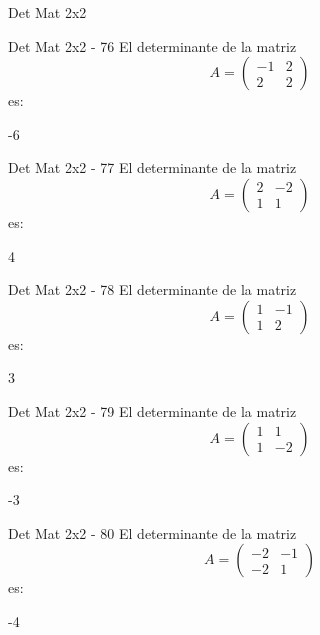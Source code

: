 \documentclass[a4,11pt]{aleph-notas}
\begin{document}
\begin{quiz}{Det Mat 2x2}
\begin{numerical}[tolerance=0]%
    {Det Mat 2x2 - 76}
    El determinante de la matriz
    \[
        A = \begin{pmatrix} -1 & 2 \\ 2 & 2 \end{pmatrix}
    \]
    es:
    \item[] -6
\end{numerical}

\begin{numerical}[tolerance=0]%
    {Det Mat 2x2 - 77}
    El determinante de la matriz
    \[
        A = \begin{pmatrix} 2 & -2 \\ 1 & 1 \end{pmatrix}
    \]
    es:
    \item[] 4
\end{numerical}

\begin{numerical}[tolerance=0]%
    {Det Mat 2x2 - 78}
    El determinante de la matriz
    \[
        A = \begin{pmatrix} 1 & -1 \\ 1 & 2 \end{pmatrix}
    \]
    es:
    \item[] 3
\end{numerical}

\begin{numerical}[tolerance=0]%
    {Det Mat 2x2 - 79}
    El determinante de la matriz
    \[
        A = \begin{pmatrix} 1 & 1 \\ 1 & -2 \end{pmatrix}
    \]
    es:
    \item[] -3
\end{numerical}

\begin{numerical}[tolerance=0]%
    {Det Mat 2x2 - 80}
    El determinante de la matriz
    \[
        A = \begin{pmatrix} -2 & -1 \\ -2 & 1 \end{pmatrix}
    \]
    es:
    \item[] -4
\end{numerical}


\end{quiz}
\end{document}
